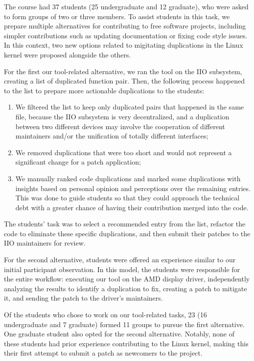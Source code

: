 \documentclass[10pt,conference]{IEEEtran}
\begin{document}
The course had 37 students (25 undergraduate and 12 graduate), who were asked to form groups of 
two or three members. To assist students in this task, we prepare multiple 
alternatives for contributing to free software projects, including simpler contributions such as 
updating documentation or fixing code style issues. In this context, two new options related to migitating
duplications in the Linux kernel were proposed alongside the others.

For the first our tool-related alternative, we ran the tool on the IIO subsystem, creating a list of duplicated function pair. Then, the following process happened to the list to prepare more actionable duplications to the students:

\begin{enumerate}
    \item We filtered the list to keep only duplicated pairs that happened in the same file, because the IIO subsystem is very decentralized, and a duplication between two different devices may involve the cooperation of different maintainers and/or the unification of totally different interfaces;
    \item We removed duplications that were too short and would not represent a significant change for a patch application;
    \item We manually ranked code duplications and marked some duplications with insights based on personal opinion and perceptions over the remaining entries. This was done to guide students so that they could approach the technical debt with a greater chance of having their contribution merged into the code.
\end{enumerate}

The students' task was to select a recommended entry from the list, refactor the code to eliminate these specific duplications, and then submit their patches to the IIO maintainers for review.

For the second alternative, students were offered an experience similar to our initial participant 
observation. In this model, the students were responsible for the entire workflow: executing our tool on the AMD display driver, independently analyzing the results to identify a duplication 
to fix, creating a patch to mitigate it, and sending the patch to the driver's maintainers.

Of the students who chose to work on our tool-related tasks, 23 (16 undergraduate and 7 graduate) 
formed 11 groups to pursue the first alternative. One graduate student also opted for the second alternative. Notably, none of these students had prior experience contributing to the Linux kernel, making this their first attempt to submit a patch as newcomers to the project.
\end{document}
